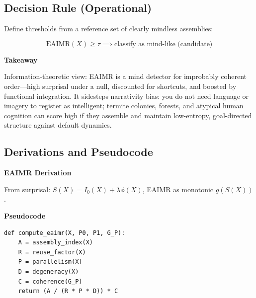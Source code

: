\documentclass{article}
\begin{document}
\subsection{Decision Rule (Operational)}
Define thresholds from a reference set of clearly mindless assemblies:

\[ \mathrm{EAIMR}(X) \ge \tau \implies \text{classify as mind-like (candidate)} \]

\textbf{Takeaway}

Information-theoretic view: EAIMR is a mind detector for improbably coherent order---high surprisal under a null, discounted for shortcuts, and boosted by functional integration. It sidesteps narrativity bias: you do not need language or imagery to register as intelligent; termite colonies, forests, and atypical human cognition can score high if they assemble and maintain low-entropy, goal-directed structure against default dynamics.

\subsection{Derivations and Pseudocode}
\textbf{EAIMR Derivation}

From surprisal: $S(X) = I_0(X) + \lambda \phi(X)$, EAIMR as monotonic $g(S(X))$.

\textbf{Pseudocode}

\begin{verbatim}
def compute_eaimr(X, P0, P1, G_P):
    A = assembly_index(X)
    R = reuse_factor(X)
    P = parallelism(X)
    D = degeneracy(X)
    C = coherence(G_P)
    return (A / (R * P * D)) * C
\end{verbatim}



\end{document}
